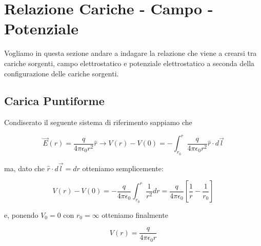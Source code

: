 \section{Relazione Cariche - Campo - Potenziale}
Vogliamo in questa sezione andare a indagare la relazione che viene a crearsi tra cariche sorgenti, campo elettrostatico e potenziale elettrostatico a seconda della configurazione delle cariche sorgenti. 

\subsection{Carica Puntiforme}
Condiserato il seguente sistema di riferimento sappiamo che

\begin{figure}[ht]
	\centering
\end{figure}



\begin{equation}
	\vec{E}(r) = \frac{q}{4\pi\epsilon_0 r^2} \hat{r} \longrightarrow V(r)  - V(0)  = -\int_{r_0}^{r} \frac{q}{4\pi\epsilon_0 r^2} \hat{r} \cdot  d\vec{l}
\end{equation}


ma, dato che $\hat{r} \cdot d\vec{l} = dr$ otteniamo semplicemente: 

\begin{equation}
	V(r) - V(0) = - \frac{q}{4 \pi \epsilon_0} \int_{r_0}^{r} \frac{1}{r^2} dr = \frac{q}{4 \pi \epsilon_0}  \left[\frac{1}{r} - \frac{1}{r_0}\right]
\end{equation}

e, ponendo $V_0 = 0$ con $r_0 = \infty$ otteniamo finalmente

\begin{large}
	\begin{equation}\label{eq_potenziale_puntiforme}
		V(r) = \frac{q}{4\pi\epsilon_0r}
	\end{equation}
\end{large}

